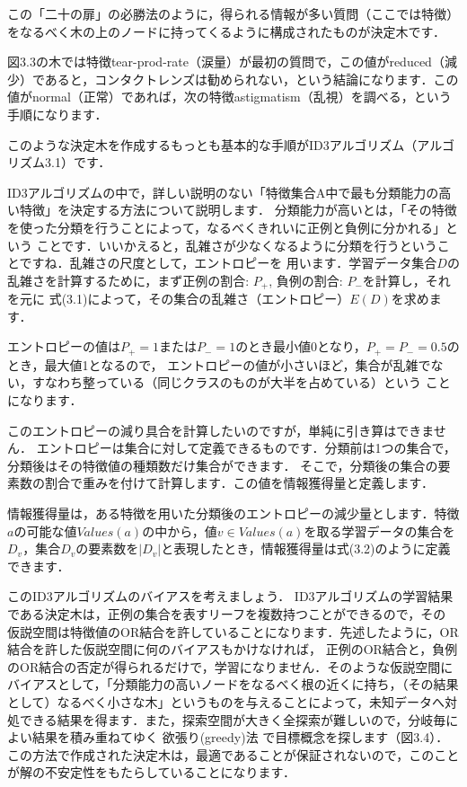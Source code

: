 この「二十の扉」の必勝法のように，得られる情報が多い質問（ここでは特徴）をなるべく木の上のノードに持ってくるように構成されたものが決定木です．


図3.3の木では特徴tear-prod-rate（涙量）が最初の質問で，この値がreduced（減少）であると，コンタクトレンズは勧められない，という結論になります．この値がnormal（正常）であれば，次の特徴astigmatism（乱視）を調べる，という手順になります．


このような決定木を作成するもっとも基本的な手順がID3アルゴリズム（アルゴリズム3.1）です．


ID3アルゴリズムの中で，詳しい説明のない「特徴集合A中で最も分類能力の高い特徴」を決定する方法について説明します．
分類能力が高いとは，「その特徴を使った分類を行うことによって，なるべくきれいに正例と負例に分かれる」という
ことです．いいかえると，乱雑さが少なくなるように分類を行うということですね．乱雑さの尺度として，エントロピーを
用います．学習データ集合$D$の乱雑さを計算するために，まず正例の割合: $P_+$,  負例の割合: $P_-$を計算し，それを元に
式(3.1)によって，その集合の乱雑さ（エントロピー）$E(D)$を求めます．

エントロピーの値は$P_+=1$または$P_-=1$のとき最小値0となり，$P_+=P_-=0.5$のとき，最大値1となるので，
エントロピーの値が小さいほど，集合が乱雑でない，すなわち整っている（同じクラスのものが大半を占めている）という
ことになります．

このエントロピーの減り具合を計算したいのですが，単純に引き算はできません．
エントロピーは集合に対して定義できるものです．分類前は1つの集合で，分類後はその特徴値の種類数だけ集合ができます．
そこで，分類後の集合の要素数の割合で重みを付けて計算します．この値を情報獲得量と定義します．


情報獲得量は，ある特徴を用いた分類後のエントロピーの減少量とします．特徴$a$の可能な値$Values(a)$の中から，値$v \in Values(a)$を取る学習データの集合を$D_v$，集合$D_v$の要素数を$|D_v|$と表現したとき，情報獲得量は式(3.2)のように定義できます．


このID3アルゴリズムのバイアスを考えましょう．
ID3アルゴリズムの学習結果である決定木は，正例の集合を表すリーフを複数持つことができるので，その
仮説空間は特徴値のOR結合を許していることになります．先述したように，OR結合を許した仮説空間に何のバイアスもかけなければ，
正例のOR結合と，負例のOR結合の否定が得られるだけで，学習になりません．そのような仮説空間に
バイアスとして，「分類能力の高いノードをなるべく根の近くに持ち，（その結果として）なるべく小さな木」というものを与えることによって，未知データへ対処できる結果を得ます．また，探索空間が大きく全探索が難しいので，分岐毎によい結果を積み重ねてゆく
欲張り(greedy)法
で目標概念を探します（図3.4）．この方法で作成された決定木は，最適であることが保証されないので，このことが解の不安定性をもたらしていることになります．

